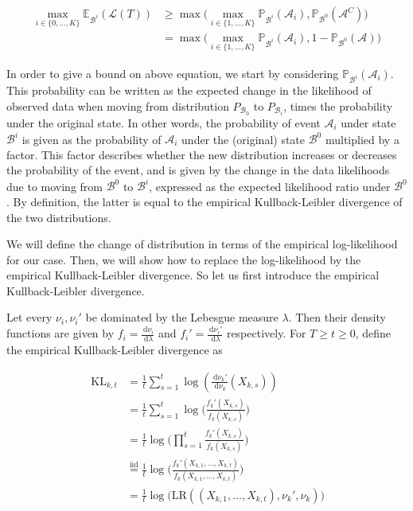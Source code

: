 \documentclass[12pt,]{article}
\newcommand{\KL}{\,\text{KL}}
\newcommand{\der}{\,\text{d}}
\begin{document}
\begin{align}
\max_{i \in \{0, \dots, K\}} \mathbb{E}_{\mathcal{B}^i} (\mathcal{L}(T)) & \geq \max \big( \max_{i \in \{1, \dots, K\}} \mathbb{P}_{\mathcal{B}^i}(\mathcal{A}_i), \mathbb{P}_{\mathcal{B}^0}(\mathcal{A}^C) \big) \\
& = \max \big( \max_{i \in \{1, \dots, K\}} \mathbb{P}_{\mathcal{B}^i}(\mathcal{A}_i), 1 - \mathbb{P}_{\mathcal{B}^0}(\mathcal{A}) \big) \label{LocatelliTheorem1ExpRegret}
\end{align}

In order to give a bound on above equation, we start by considering
\(\mathbb{P}_{\mathcal{B}^i}(\mathcal{A}_i)\). This probability can be
written as the expected change in the likelihood of observed data when
moving from distribution \(P_{\mathcal{B}_0}\) to \(P_{\mathcal{B}_i}\),
times the probability under the original state. In other words, the
probability of event \(\mathcal{A}_i\) under state \(\mathcal{B}^i\) is
given as the probability of \(\mathcal{A}_i\) under the (original) state
\(\mathcal{B}^0\) multiplied by a factor. This factor describes whether
the new distribution increases or decreases the probability of the
event, and is given by the change in the data likelihoods due to moving
from \(\mathcal{B}^0\) to \(\mathcal{B}^i\), expressed as the expected
likelihood ratio under \(\mathcal{B}^0\). By definition, the latter is
equal to the empirical Kullback-Leibler divergence of the two
distributions.

We will define the change of distribution in terms of the empirical
log-likelihood for our case. Then, we will show how to replace the
log-likelihood by the empirical Kullback-Leibler divergence. So let us
first introduce the empirical Kullback-Leibler divergence.

Let every \(\nu_i, \nu_i'\) be dominated by the Lebesgue measure
\(\lambda\). Then their density functions are given by
\(f_i = \frac{\der \nu_i}{\der \lambda}\) and
\(f_i' = \frac{\der \nu_i'}{\der \lambda}\) respectively. For
\(T \geq t \geq 0\), define the empirical Kullback-Leibler divergence as

\begin{align*}
\hat{\KL}_{k,t} & = \frac{1}{t} \sum_{s=1}^{t} \log(\frac{\der \nu_k'}{\der \nu_k}(X_{k,s})) \\
& = \frac{1}{t} \sum_{s=1}^{t} \log \big(\frac{f_k'(X_{k,s})}{f_k(X_{k,s})} \big) \\
& = \frac{1}{t} \log \big( \prod_{s=1}^{t} \frac{f_k'(X_{k,s})}{f_k(X_{k,s})} \big) \\
& \stackrel{\text{iid}}{=} \frac{1}{t} \log \big( \frac{f_k'(X_{k,1}, \dots,X_{k,t})}{f_k(X_{k,1}, \dots,X_{k,t})} \big) \\
& = \frac{1}{t} \log \big( \text{LR}((X_{k,1}, \dots,X_{k,t}), \nu_k', \nu_k) \big)
\end{align*}
\end{document}

